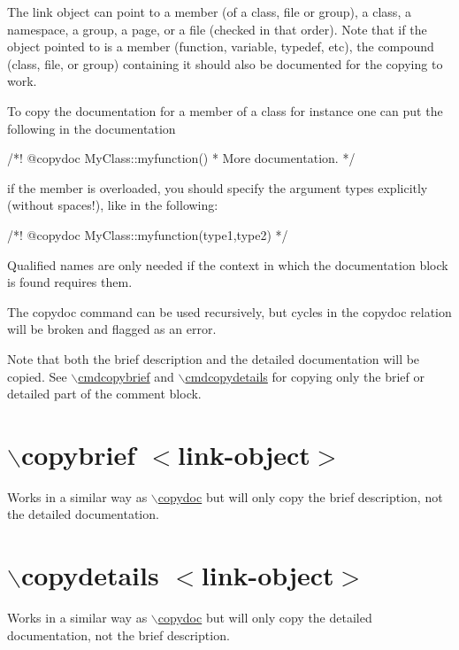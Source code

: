 The link object can point to a member (of a class, file or group), a class, a namespace, a group, a page, or a file (checked in that order). Note that if the object pointed to is a member (function, variable, typedef, etc), the compound (class, file, or group) containing it should also be documented for the copying to work.

To copy the documentation for a member of a class for instance one can put the following in the documentation

\begin{DoxyVerb}
  /*! @copydoc MyClass::myfunction() 
   *  More documentation.
   */
\end{DoxyVerb}


if the member is overloaded, you should specify the argument types explicitly (without spaces!), like in the following:

\begin{DoxyVerb}
  /*! @copydoc MyClass::myfunction(type1,type2) */
\end{DoxyVerb}


Qualified names are only needed if the context in which the documentation block is found requires them.

The copydoc command can be used recursively, but cycles in the copydoc relation will be broken and flagged as an error.

Note that both the brief description and the detailed documentation will be copied. See \hyperlink{commands_cmdcopybrief}{$\backslash$cmdcopybrief} and \hyperlink{commands_cmdcopydetails}{$\backslash$cmdcopydetails} for copying only the brief or detailed part of the comment block.



 \hypertarget{commands_cmdcopybrief}{}\section{$\backslash$copybrief $<$link-\/object$>$}\label{commands_cmdcopybrief}
Works in a similar way as \hyperlink{commands_cmdcopydoc}{$\backslash$copydoc} but will only copy the brief description, not the detailed documentation.



 \hypertarget{commands_cmdcopydetails}{}\section{$\backslash$copydetails $<$link-\/object$>$}\label{commands_cmdcopydetails}
Works in a similar way as \hyperlink{commands_cmdcopydoc}{$\backslash$copydoc} but will only copy the detailed documentation, not the brief description.



